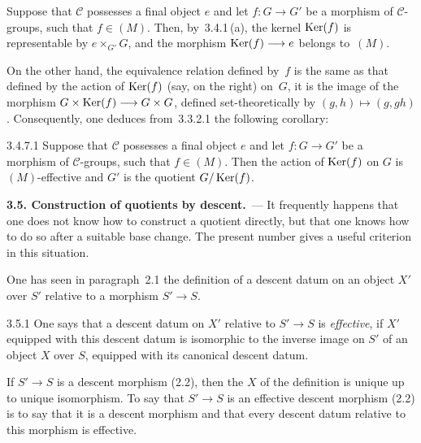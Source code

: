 \label{IV.3.4.7}%
{\renewcommand{\thefootnote}{(16)}}%
Suppose that \(\mathcal{C}\) possesses a final object \(e\) and let
\(f\colon G\to G'\) be a morphism of \(\mathcal{C}\)-groups, such that
\(f\in(M)\). Then, by~3.4.1\,(a), the kernel \(\operatorname{Ker}(f)\) is representable
by \(e\times_{G'}G\), and the morphism \(\operatorname{Ker}(f)\longrightarrow e\) belongs to~\((M)\).

On the other hand, the equivalence relation defined by~\(f\) is the same as
that defined by the action of \(\operatorname{Ker}(f)\) (say, on the right) on~\(G\),
\ie it is the image of the morphism
\(G\times\operatorname{Ker}(f)\longrightarrow G\times G\), defined set-theoretically by
\((g,h)\mapsto(g,gh)\). Consequently, one deduces from~3.3.2.1 the
following corollary:

\begin{corollary}{3.4.7.1}
\label{IV.3.4.7.1}
Suppose that \(\mathcal{C}\) possesses a final object \(e\) and let
\(f\colon G\to G'\) be a morphism of \(\mathcal{C}\)-groups, such that
\(f\in(M)\). Then the action of \(\operatorname{Ker}(f)\) on \(G\) is \((M)\)-effective
and \(G'\) is the quotient \(G/\operatorname{Ker}(f)\).
\end{corollary}

\par{}
\noindent\textbf{3.5. Construction of quotients by descent.}\label{IV.sec.3.5}\ ---
It frequently happens that one does not know how to construct a quotient
directly, but that one knows how to do so after a suitable base change.
The present number gives a useful criterion in this situation.

One has seen in paragraph~2.1 the definition of a descent datum on an
object \(X'\) over \(S'\) relative to a morphism \(S'\to S\).

\begin{definition}{3.5.1}
\label{IV.3.5.1}
One says that a descent datum on \(X'\) relative to \(S'\to S\) is
\emph{effective}, if \(X'\) equipped with this descent datum is isomorphic
to the inverse image on \(S'\) of an object \(X\) over \(S\), equipped with
its canonical descent datum.
\end{definition}

If \(S'\to S\) is a descent morphism (2.2), then the \(X\) of the definition
is unique up to unique isomorphism. To say that \(S'\to S\) is an effective
descent morphism (2.2) is to say that it is a descent morphism and that
every descent datum relative to this morphism is effective.

